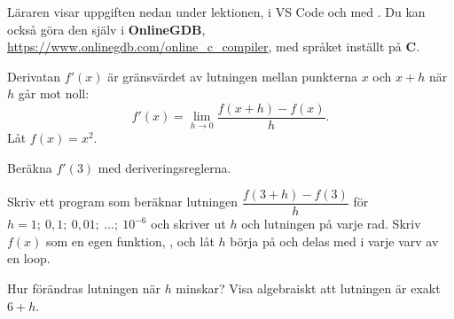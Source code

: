 Läraren visar uppgiften nedan under lektionen, i VS Code och med . Du kan också göra den
själv i \textbf{OnlineGDB}, \url{https://www.onlinegdb.com/online_c_compiler}, med språket inställt
på \textbf{C}.

Derivatan $f'(x)$ är gränsvärdet av lutningen mellan punkterna $x$ och $x + h$ när $h$ går mot
noll:
\[
  f'(x) = \lim_{h \to 0} \frac{f(x + h) - f(x)}{h}.
\]
Låt $f(x) = x^2$.
\begin{parts}
  \item Beräkna $f'(3)$ med deriveringsreglerna.
  \item Skriv ett program som beräknar lutningen $\dfrac{f(3 + h) - f(3)}{h}$ för
    $h = 1;\ 0{,}1;\ 0{,}01;\ \ldots;\ 10^{-6}$ och skriver ut $h$ och lutningen på varje rad. Skriv
    $f(x)$ som en egen funktion, , och låt $h$ börja på  och
    delas med  i varje varv av en loop.
  \item Hur förändras lutningen när $h$ minskar? Visa algebraiskt att lutningen är exakt $6 + h$.
\end{parts}
